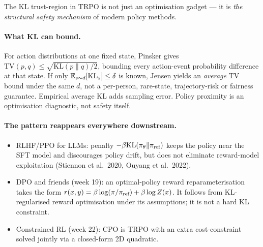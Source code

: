 \documentclass[11pt,oneside]{scrbook}
\begin{document}
\begin{safetyangle}
The KL trust-region in TRPO is not just an optimisation gadget --- it is \emph{the structural safety mechanism} of modern policy methods.

\paragraph{What KL can bound.}
For action distributions at one fixed state, Pinsker gives
$\mathrm{TV}(p,q)\le\sqrt{\mathrm{KL}(p\|q)/2}$, bounding every
action-event probability difference at that state. If only
$\mathbb{E}_{s\sim d}[\mathrm{KL}_s]\le\delta$ is known, Jensen yields an
\emph{average} TV bound under the same $d$, not a per-person, rare-state,
trajectory-risk or fairness guarantee. Empirical average KL adds sampling
error. Policy proximity is an optimisation diagnostic, not safety itself.

\paragraph{The pattern reappears everywhere downstream.}
\begin{itemize}[leftmargin=*]
  \item RLHF/PPO for LLMs: penalty $-\beta \mathrm{KL}(\pi_\theta \| \pi_\text{ref})$ keeps the policy near the SFT model and discourages policy drift, but does not eliminate reward-model exploitation (Stiennon et al.\ 2020, Ouyang et al.\ 2022).
  \item DPO and friends (week 19): an optimal-policy reward reparameterisation takes the form
$r(x,y)=\beta\log(\pi/\pi_\text{ref})+\beta\log Z(x)$.
It follows from KL-regularised reward optimisation under its assumptions;
it is not a hard KL constraint.
  \item Constrained RL (week 22): CPO is TRPO with an extra cost-constraint solved jointly via a closed-form 2D quadratic.
\end{itemize}


\end{safetyangle}
\end{document}
